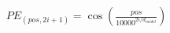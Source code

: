 \documentclass[preview]{standalone}
\begin{document}
\begin{align*}
PE_{(pos, 2i+1)} = \cos\left(\frac{pos}{10000^{2i/d_{model}}}\right)
\end{align*}
\end{document}
